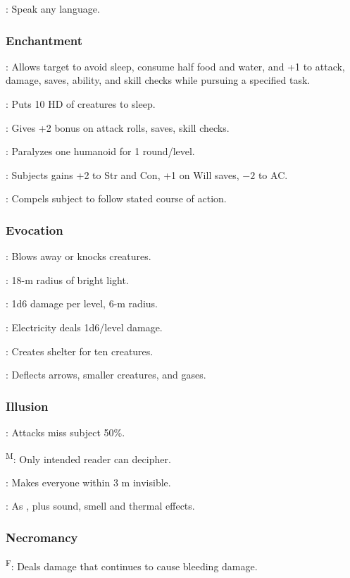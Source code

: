 	: Speak any language.

\subsubsection{Enchantment}
	: Allows target to avoid sleep, consume half food and water, and +1 to attack, damage, saves, ability, and skill checks while pursuing a specified task. %

	: Puts 10 HD of creatures to sleep.

	: Gives +2 bonus on attack rolls, saves, skill checks.

	: Paralyzes one humanoid for 1 round/level.

	: Subjects gains +2 to Str and Con, +1 on Will saves, $-2$ to AC.

	: Compels subject to follow stated course of action.

\subsubsection{Evocation}
	: Blows away or knocks creatures.

	: 18-m radius of bright light.

	: 1d6 damage per level, 6-m radius.

	: Electricity deals 1d6/level damage.

	: Creates shelter for ten creatures.

	: Deflects arrows, smaller creatures, and gases.

\subsubsection{Illusion}
	: Attacks miss subject 50\%.

	\textsuperscript{M}: Only intended reader can decipher.

	: Makes everyone within 3 m invisible.

	: As , plus sound, smell and thermal effects.

\subsubsection{Necromancy}
	\textsuperscript{F}: Deals damage that continues to cause bleeding damage. %

